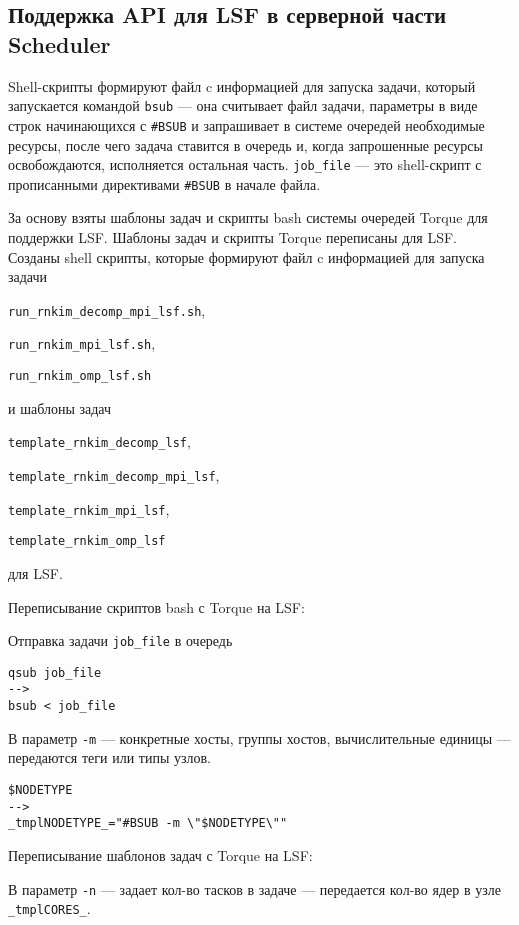 \subsection{Поддержка API для LSF в серверной части Scheduler}

Shell-скрипты формируют файл c информацией для запуска задачи, который запускается командой \lstinline{bsub} --- она считывает файл задачи, параметры в виде строк начинающихся с \lstinline{#BSUB} и запрашивает в системе очередей необходимые ресурсы, после чего задача ставится в очередь и, когда запрошенные ресурсы освобождаются, исполняется остальная часть. \lstinline{job_file} --- это shell-скрипт с прописанными директивами \lstinline{#BSUB} в начале файла.

За основу взяты шаблоны задач и скрипты bash системы очередей Torque для поддержки LSF. Шаблоны задач и скрипты Torque переписаны для LSF. Созданы shell скрипты, которые формируют файл c информацией для запуска задачи

\lstinline{run_rnkim_decomp_mpi_lsf.sh},

\lstinline{run_rnkim_mpi_lsf.sh},

\lstinline{run_rnkim_omp_lsf.sh}

и шаблоны задач

\lstinline{template_rnkim_decomp_lsf},

\lstinline{template_rnkim_decomp_mpi_lsf},

\lstinline{template_rnkim_mpi_lsf},

\lstinline{template_rnkim_omp_lsf}

для LSF.

Переписывание скриптов bash с Torque на LSF:

{
Отправка задачи \lstinline{job_file} в очередь 

\begin{lstlisting}
qsub job_file
-->
bsub < job_file
\end{lstlisting}
}

В параметр \lstinline{-m} --- конкретные хосты, группы хостов, вычислительные единицы --- передаются теги или типы узлов.

\begin{lstlisting}
$NODETYPE
-->
_tmplNODETYPE_="#BSUB -m \"$NODETYPE\""
\end{lstlisting}

Переписывание шаблонов задач с Torque на LSF:

В параметр \lstinline{-n} --- задает кол-во тасков в задаче --- передается кол-во ядер в узле \lstinline{_tmplCORES_}.

